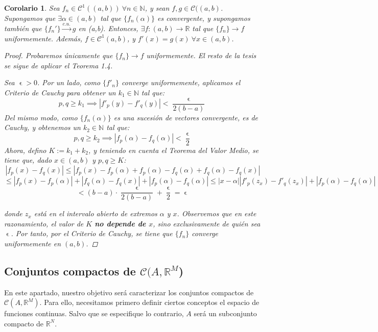 \documentclass[11pt, a4paper]{article}
\let\epsilon\upvarepsilon
\newcommand{\fn}{\{f_n\}}
\theoremstyle{theorem-style}
\newtheorem{ncor}{Corolario}[section]
\theoremstyle{definition-style}
\theoremstyle{remark-style}
\theoremstyle{example-style}
\begin{document}
\begin{ncor}
	Sea $f_n\in \mathcal{C}^1((a,b)) \ \forall n \in \mathbb{N}$, y sean $f,g \in \mathcal{C}((a,b)$. Supongamos que $\exists \alpha \in (a,b)$ tal que $ \{f_n(\alpha)\}$ es convergente, y supongamos también que $\{f_n'\} \xrightarrow{c.u.} g $ en (a,b). Entonces, $\exists f: (a,b) \to \mathbb{R}$ tal que $\fn \to f$ uniformemente. Además, $f \in \mathcal{C}^1(a,b)$, y  $f'(x) = g(x)\ \forall x \in (a,b)$.

\begin{proof}
	Probaremos únicamente que $\fn \to f$ uniformemente. El resto de la tesis se sigue de aplicar el \textit{Teorema 1.4}.
	
Sea $\epsilon > 0$. Por un lado, como $\{f'_n\}$ converge uniformemente, aplicamos el \textit{Criterio de Cauchy} para obtener un $k_1 \in \mathbb{N}$ tal que: $$p,q \ge k_1 \implies |f'_p(y) - f'_q(y)| < \frac{\epsilon}{2 (b-a)}$$
Del mismo modo, como $\{f_n(\alpha)\}$ es una sucesión de vectores convergente, es de Cauchy, y obtenemos un $k_2 \in \mathbb{N}$ tal que: $$p,q \ge k_2 \implies |f_p(\alpha) - f_q(\alpha)| < \frac{\epsilon}{2}$$
Ahora, defino $K := k_1 + k_2$, y teniendo en cuenta el \textit{Teorema del Valor Medio}, se tiene que, dado $x \in (a,b)$ y $p,q \ge K$: $$|f_p(x) - f_q(x)| \le |f_p(x) - f_p(\alpha) + f_p(\alpha) - f_q(\alpha) + f_q(\alpha) - f_q(x)|$$ $$\le |f_p(x) - f_p(\alpha)| + |f_q(\alpha) - f_q(x)| + |f_p(\alpha) - f_q(\alpha)| \le \left|x-\alpha \right|\left| f'_p(z_x) - f'_q(z_x) \right| + |f_p(\alpha) - f_q(\alpha)|$$ $$< (b-a) \cdot \frac{\epsilon}{2(b-a)} + \frac{\epsilon}{2} = \epsilon$$

donde $z_x$ está en el intervalo abierto de extremos $\alpha$ y $x$. Observemos que en este razonamiento, el valor de $K$ \textbf{no depende de $x$}, sino exclusivamente de quién sea $\epsilon$. Por tanto, por el \textit{Criterio de Cauchy}, se tiene que $\{f_n\}$ converge uniformemente en $(a,b)$.
\end{proof}
	
\end{ncor}


\subsection{Conjuntos compactos de $\mathcal{C}(A, \mathbb{R}^M$)}

En este apartado, nuestro objetivo será caracterizar los conjuntos compactos de $\mathcal{C}(A,\mathbb{R}^M)$. Para ello, necesitamos primero definir ciertos conceptos el espacio de funciones continuas. Salvo que se especifique lo contrario, $A$ será un subconjunto compacto de $\mathbb{R}^N$.
\end{document}
